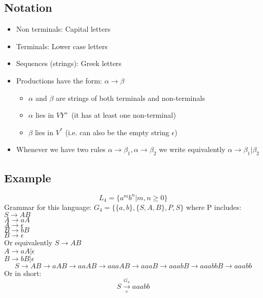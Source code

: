 \documentclass{article}[18pt]
\begin{document}
\subsection{Notation}
\begin{itemize}
	\item Non terminals: Capital letters
	\item Terminals: Lower case letters
	\item Sequences (strings): Greek letters
	\item Productions have the form: $\alpha \rightarrow \beta$
	\begin{itemize}
		\item $\alpha$ and $\beta$ are strings of both terminals and non-terminals
		\item $\alpha$ lies in $VY^+$ (it has at least one non-terminal)
		\item $\beta$ lies in $V^*$ (i.e. can also be the empty string $\epsilon$)
	\end{itemize}
	\item Whenever we have two rules $\alpha\rightarrow \beta_1, \alpha\rightarrow \beta_2$ we write equivalently $\alpha \rightarrow \beta_1|\beta_2$
\end{itemize}
\subsection{Example}
$$L_4=\{a^mb^n|m,n\geqslant 0\}$$
Grammar for this language: $G_4=\{ \{a,b\},\{S,A,B\},P,S\}$ where P includes:\\
$S\rightarrow AB$\\
$A\rightarrow a A$\\
$A\rightarrow\epsilon$\\
$B\rightarrow bB$\\
$B\rightarrow \epsilon$\\
Or equivalently
$S\rightarrow AB$\\
$A\rightarrow aA | \epsilon$\\
$B\rightarrow bB | \epsilon$
$$S\rightarrow AB \rightarrow aAB \rightarrow aaAB \rightarrow aaaAB \rightarrow aaaB \rightarrow aaabB \rightarrow aaabbB \rightarrow aaabb$$
Or in short:
$$S\xrightarrow[+]{G_4}aaabb$$
\end{document}
